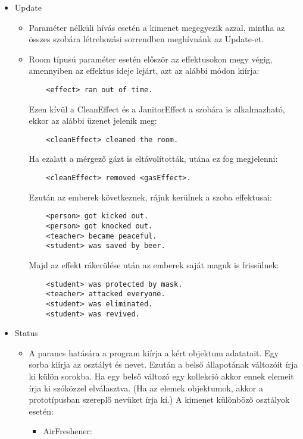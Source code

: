 \begin{itemize}
    \item Update
    \begin{itemize}
        \item Paraméter nélküli hívás esetén a kimenet megegyezik azzal, mintha az összes szobára létrehozási sorrendben meghívnánk az Update-et.
        \item Room típusú paraméter esetén először az effektusokon megy végig, amennyiben az effektus ideje lejárt, azt az alábbi módon kiírja:
        \begin{verbatim}
    <effect> ran out of time.
        \end{verbatim}
        Ezen kívül a CleanEffect és a JanitorEffect a szobára is alkalmazható, ekkor az alábbi üzenet jelenik meg:
        \begin{verbatim}
    <cleanEffect> cleaned the room.
        \end{verbatim}
        Ha ezalatt a mérgező gázt is eltávolították, utána ez fog megjelenni:
        \begin{verbatim}
    <cleanEffect> removed <gasEffect>.
        \end{verbatim}
        Ezután az emberek következnek, rájuk kerülnek a szoba effektusai:
        \begin{verbatim}
    <person> got kicked out.
    <person> got knocked out.
    <teacher> became peaceful.
    <student> was saved by beer.
        \end{verbatim}
        Majd az effekt rákerülése után az emberek saját maguk is frissülnek:
        \begin{verbatim}
    <student> was protected by mask.
    <teacher> attacked everyone.
    <student> was eliminated.
    <student> was revived.
        \end{verbatim}
    \end{itemize}
    


    \item Status
    \begin{itemize}
        \item A parancs hatására a program kiírja a kért objektum adatatait. Egy sorba kiírja az osztályt és nevet. Ezután a belső állapotának változóit írja ki külön sorokba. Ha egy belső változó egy kollekció akkor ennek elemeit írja ki szóközzel elválasztva. (Ha az elemek objektumok, akkor a prototípusban szereplő nevüket írja ki.) 
        \newline A kimenet különböző osztályok esetén:
    \begin{itemize}
        \item AirFreshener:


\end{itemize}
\end{itemize}
\end{itemize}
